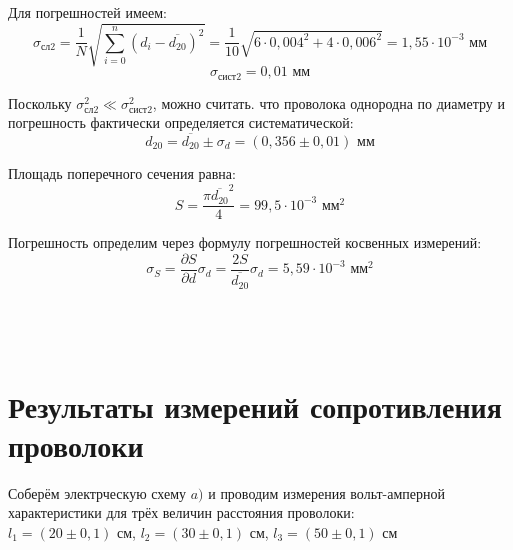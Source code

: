 \documentclass[a4paper, 12pt]{article} %
\begin{document}
Для погрешностей имеем:
\[\sigma_{\text{сл}2} = \frac{1}{N}\sqrt{\sum_{i = 0}^{n}{(d_i-\overline{d_{20}})^2}} = \frac{1}{10} \sqrt{6\cdot 0,004^2 + 4\cdot 0,006^2} = 1,55\cdot 10^{-3} \text{ мм}\] 
\[\sigma_{\text{сист}2} = 0,01 \text{ мм}\]

Поскольку $\sigma_{\text{сл}2}^2 \ll \sigma_{\text{сист}2}^2$, можно считать. что проволока однородна по диаметру и погрешность фактически определяется систематической:
\[d_{20} = \overline{d_{20}} \pm \sigma_d = (0,356 \pm 0,01) \text{ мм}\]

Площадь поперечного сечения равна:
\[S = \frac{\pi \overline{d_{20}}^2}{4} = 99,5\cdot 10^{-3}\text{ мм}^{2}\]

Погрешность определим через формулу погрешностей косвенных измерений:
\[\sigma_S = \frac{\partial{S}}{\partial{d}}\sigma_d = \frac{2S}{\overline{d_{20}}}\sigma_d = 5,59\cdot 10^{-3}\text{ мм}^{2}\]\\\\\\

\section{Результаты измерений сопротивления проволоки}

Соберём электрческую схему $a)$ и проводим измерения вольт-амперной характеристики для трёх величин расстояния проволоки:\\ $l_1=(20\pm 0,1)$ см, $l_2=(30\pm 0,1)$ см, $l_3=(50\pm 0,1)$ см
\end{document}
